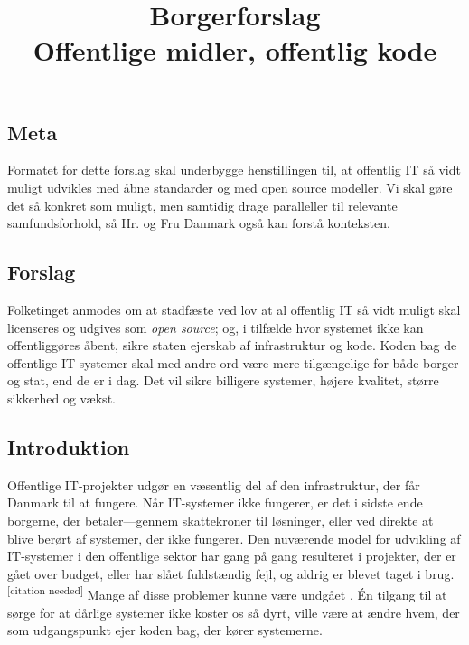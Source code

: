 \documentclass[fleqn]{article}
\title{
    Borgerforslag\\
    Offentlige midler, offentlig kode
}
\author{}
\begin{document}
\maketitle

\setcounter{secnumdepth}{0}

\subsection{Meta}

Formatet for dette forslag skal underbygge henstillingen til, at offentlig IT så vidt muligt udvikles
med åbne standarder og med open source modeller. Vi skal gøre det så konkret som muligt,
men samtidig drage paralleller til relevante samfundsforhold, så Hr. og Fru Danmark også 
kan forstå konteksten.

\subsection{Forslag}

\begin{large}
Folketinget anmodes om at stadfæste ved lov at al offentlig IT så vidt muligt skal licenseres
og udgives som \textit{open source}; og, i tilfælde hvor systemet ikke kan offentliggøres åbent, sikre staten ejerskab af infrastruktur og kode.
Koden bag de offentlige IT-systemer skal med andre ord være mere tilgængelige for både borger og stat, end de er i dag.
Det vil sikre billigere systemer, højere kvalitet, større sikkerhed og vækst.
\end{large}

\subsection{Introduktion}

Offentlige IT-projekter udgør en væsentlig del af den infrastruktur, der får Danmark til at fungere.
Når IT-systemer ikke fungerer, er det i sidste ende borgerne, der betaler---gennem skattekroner til løsninger, eller ved direkte at blive berørt af systemer, der ikke fungerer.
Den nuværende model for udvikling af IT-systemer i den offentlige sektor har gang på gang resulteret i projekter, der er gået over budget, eller har slået fuldstændig fejl, og aldrig er blevet taget i brug.\textsuperscript{[citation needed]}
Mange af disse problemer kunne være undgået \cite{ITU}.
Én tilgang til at sørge for at dårlige systemer ikke koster os så dyrt, ville være at ændre hvem, der som udgangspunkt ejer koden bag, der kører systemerne.
\end{document}

